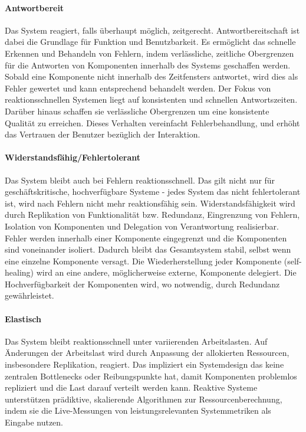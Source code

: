 \paragraph{Antwortbereit}Das System reagiert, falls überhaupt möglich, zeitgerecht. Antwortbereitschaft ist dabei die Grundlage für Funktion und
Benutzbarkeit. Es ermöglicht das schnelle Erkennen und Behandeln von Fehlern, indem verlässliche, zeitliche Obergrenzen für die Antworten von
Komponenten innerhalb des Systems geschaffen werden. Sobald eine Komponente nicht innerhalb des Zeitfensters antwortet, wird dies als Fehler gewertet und kann
entsprechend behandelt werden.
Der Fokus von reaktionsschnellen Systemen liegt auf konsistenten und schnellen Antwortszeiten. Darüber hinaus schaffen sie
verlässliche Obergrenzen um eine konsistente Qualität zu erreichen.
Dieses Verhalten vereinfacht Fehlerbehandlung, und erhöht das Vertrauen der Benutzer bezüglich der Interaktion.

\paragraph{Widerstandsfähig/Fehlertolerant}Das System bleibt auch bei Fehlern reaktionsschnell. Das gilt nicht nur für geschäftskritische, hochverfügbare Systeme -
jedes System das nicht fehlertolerant ist, wird nach Fehlern nicht mehr reaktionsfähig sein.
Widerstandsfähigkeit wird durch Replikation von Funktionalität bzw. Redundanz, Eingrenzung von Fehlern, Isolation von Komponenten und
Delegation von Verantwortung realisierbar.
Fehler werden innerhalb einer Komponente eingegrenzt und die Komponenten sind voneinander isoliert. Dadurch bleibt das Gesamtsystem stabil, selbst
wenn eine einzelne Komponente versagt.
Die Wiederherstellung jeder Komponente (self-healing) wird an eine andere, möglicherweise externe, Komponente delegiert.
Die Hochverfügbarkeit der Komponenten wird, wo notwendig, durch Redundanz gewährleistet.

\paragraph{Elastisch}Das System bleibt reaktionsschnell unter variierenden Arbeitslasten. Auf Änderungen der Arbeitslast wird durch
Anpassung der allokierten Ressourcen, insbesondere Replikation, reagiert. Das impliziert ein Systemdesign das keine zentralen Bottlenecks oder
Reibungspunkte hat, damit Komponenten problemlos repliziert und die Last darauf verteilt werden kann.
Reaktive Systeme unterstützen prädiktive, skalierende Algorithmen zur Ressourcenberechnung,
indem sie die Live-Messungen von leistungsrelevanten Systemmetriken als Eingabe nutzen.

